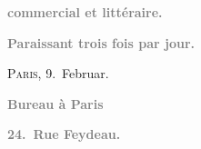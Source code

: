 \pstart
           \begin{otherlanguage}{french}\textcolor{gray}{\textbf{commercial et littéraire.}}\end{otherlanguage}\pend
           
\pstart
           \begin{otherlanguage}{french}\textcolor{gray}{\textbf{\textbf{Paraissant trois fois par jour.}}}\end{otherlanguage}\hfill \textsc{Paris}, 9. Februar.\pend
           
\pstart
           \begin{otherlanguage}{french}\textcolor{gray}{\textbf{\textbf{Bureau à Paris}}}\end{otherlanguage}\pend
           
\pstart
           \begin{otherlanguage}{french}\textcolor{gray}{\textbf{\textbf{24. Rue Feydeau.}}}\end{otherlanguage}\pend
           
